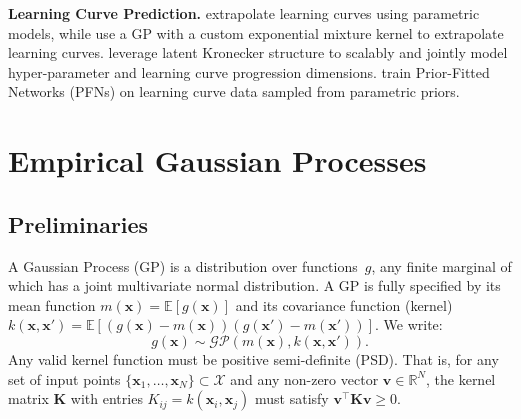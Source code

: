 \documentclass{article}
\newcommand{\domain}{\mathcal{X}}
\newcommand{\actualgp}{g}
\begin{document}
{\bf Learning Curve Prediction.}
\citet{domhan2015speeding} extrapolate learning curves using parametric models, while \citet{swersky2014freeze} use a GP with a custom exponential mixture kernel to extrapolate learning curves.
\citet{lin2025lkgp} leverage latent Kronecker structure to scalably and jointly model hyper-parameter and learning curve progression dimensions.
\citet{adriaensen2023efficient} train Prior-Fitted Networks (PFNs) on learning curve data sampled from parametric priors.



\section{Empirical Gaussian Processes}
\label{sec:egps}

\subsection{Preliminaries}
\label{sec:prelim}
A Gaussian Process (GP) is a distribution over functions~$\actualgp$, any finite marginal of which has a joint multivariate normal distribution.
A GP is fully specified by its mean function $m(\mathbf{x}) = \mathbb{E}[\actualgp(\mathbf{x})]$ and its covariance function (kernel) $k(\mathbf{x}, \mathbf{x}') = \mathbb{E}[(\actualgp(\mathbf{x}) - m(\mathbf{x}))(\actualgp(\mathbf{x}') - m(\mathbf{x}'))]$. We write:
\begin{equation}
    \nonumber
    \actualgp(\mathbf{x}) \sim \mathcal{GP}\left(m(\mathbf{x}), k(\mathbf{x}, \mathbf{x}')\right).
\end{equation}
Any valid kernel function must be positive semi-definite (PSD). That is, for any set of input points $\{\mathbf{x}_1, \ldots, \mathbf{x}_N\} \subset \domain$ and any non-zero vector $\mathbf{v} \in \mathbb{R}^N$, the kernel matrix $\mathbf{K}$ with entries $K_{ij} = k(\mathbf{x}_i, \mathbf{x}_j)$ must satisfy $\mathbf{v}^\top \mathbf{K} \mathbf{v} \geq 0$.
\end{document}
